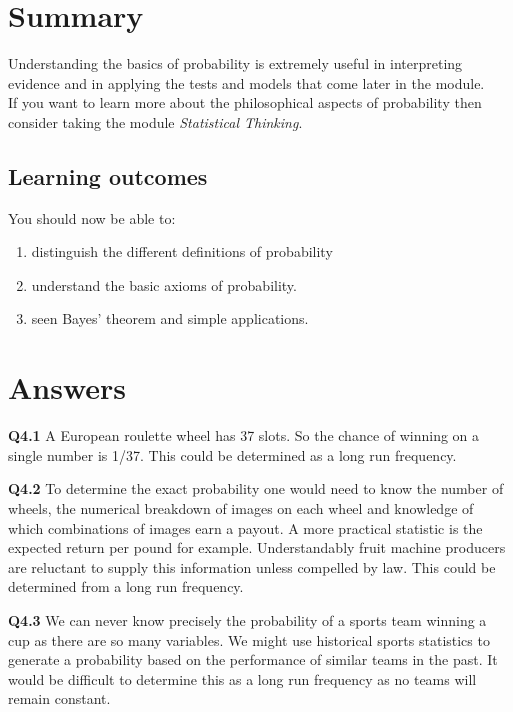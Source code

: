 \documentclass[
  oneside]{krantz}
\providecommand{\tightlist}{%
  \setlength{\itemsep}{0pt}\setlength{\parskip}{0pt}}
\begin{document}
\hypertarget{SUMprob}{%
\section{Summary}\label{SUMprob}}

Understanding the basics of probability is extremely useful in interpreting evidence and in applying the tests and models that come later in the module.\\
If you want to learn more about the philosophical aspects of probability then consider taking the module \emph{Statistical Thinking}.

\hypertarget{learning-outcomes-1}{%
\subsection{Learning outcomes}\label{learning-outcomes-1}}

You should now be able to:

\begin{enumerate}
\def\labelenumi{\arabic{enumi}.}
\tightlist
\item
  distinguish the different definitions of probability
\item
  understand the basic axioms of probability.
\item
  seen Bayes' theorem and simple applications.
\end{enumerate}

\hypertarget{ANSprob}{%
\section{Answers}\label{ANSprob}}

\textbf{Q4.1} A European roulette wheel has 37 slots. So the chance of winning on a single number is 1/37. This could be determined as a long run frequency.

\textbf{Q4.2} To determine the exact probability one would need to know the number of wheels, the numerical breakdown of images on each wheel and knowledge of which combinations of images earn a payout. A more practical statistic is the expected return per pound for example. Understandably fruit machine producers are reluctant to supply this information unless compelled by law. This could be determined from a long run frequency.

\textbf{Q4.3} We can never know precisely the probability of a sports team winning a cup as there are so many variables. We might use historical sports statistics to generate a probability based on the performance of similar teams in the past. It would be difficult to determine this as a long run frequency as no teams will remain constant.
\end{document}
